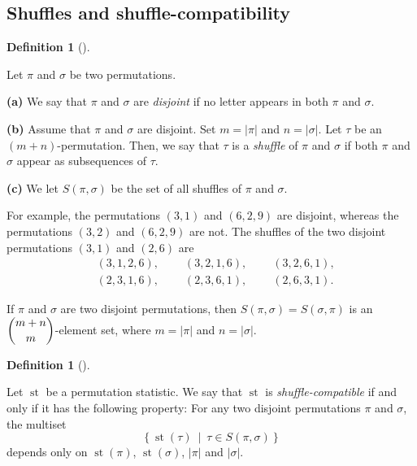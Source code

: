 \documentclass[numbers=enddot,12pt,final,onecolumn,notitlepage]{scrartcl}%
\theoremstyle{definition}
\newtheorem{defi}[theo]{Definition}
\newenvironment{definition}[1][]
{\begin{defi}[#1]\begin{leftbar}}
{\end{leftbar}\end{defi}}
\begin{document}
\subsection{Shuffles and shuffle-compatibility}

\begin{definition}
Let $\pi$ and $\sigma$ be two permutations.

\textbf{(a)} We say that $\pi$ and $\sigma$ are \textit{disjoint} if no letter
appears in both $\pi$ and $\sigma$.

\textbf{(b)} Assume that $\pi$ and $\sigma$ are disjoint. Set $m=\left\vert
\pi\right\vert $ and $n=\left\vert \sigma\right\vert $. Let $\tau$ be an
$\left(  m+n\right)  $-permutation. Then, we say that $\tau$ is a
\textit{shuffle} of $\pi$ and $\sigma$ if both $\pi$ and $\sigma$ appear as
subsequences of $\tau$.

\textbf{(c)} We let $S\left(  \pi,\sigma\right)  $ be the set of all shuffles
of $\pi$ and $\sigma$.
\end{definition}

For example, the permutations $\left(  3,1\right)  $ and $\left(
6,2,9\right)  $ are disjoint, whereas the permutations $\left(  3,2\right)  $
and $\left(  6,2,9\right)  $ are not. The shuffles of the two disjoint
permutations $\left(  3,1\right)  $ and $\left(  2,6\right)  $ are%
\begin{align*}
&  \left(  3,1,2,6\right)  ,\ \ \ \ \ \ \ \ \ \ \left(  3,2,1,6\right)
,\ \ \ \ \ \ \ \ \ \ \left(  3,2,6,1\right)  ,\\
&  \left(  2,3,1,6\right)  ,\ \ \ \ \ \ \ \ \ \ \left(  2,3,6,1\right)
,\ \ \ \ \ \ \ \ \ \ \left(  2,6,3,1\right)  .
\end{align*}


If $\pi$ and $\sigma$ are two disjoint permutations, then $S\left(  \pi
,\sigma\right)  =S\left(  \sigma,\pi\right)  $ is an $\dbinom{m+n}{m}$-element
set, where $m=\left\vert \pi\right\vert $ and $n=\left\vert \sigma\right\vert
$.

\begin{definition}
Let $\operatorname*{st}$ be a permutation statistic. We say that
$\operatorname*{st}$ is \textit{shuffle-compatible} if and only if it has the
following property: For any two disjoint permutations $\pi$ and $\sigma$, the
multiset%
\[
\left\{  \operatorname*{st}\left(  \tau\right)  \ \mid\ \tau\in S\left(
\pi,\sigma\right)  \right\}
\]
depends only on $\operatorname*{st}\left(  \pi\right)  $, $\operatorname*{st}%
\left(  \sigma\right)  $, $\left\vert \pi\right\vert $ and $\left\vert
\sigma\right\vert $.
\end{definition}
\end{document}
